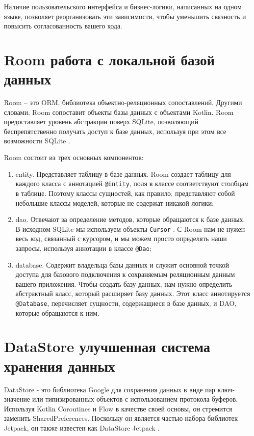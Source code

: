 Наличие пользовательского интерфейса и бизнес-логики, написанных на одном языке, позволяет реорганизовать эти зависимости, чтобы уменьшить связность и повысить согласованность вашего кода.

\section{Room работа с локальной базой данных}

Room -- это ORM, библиотека объектно-реляционных сопоставлений.  Другими словами, Room сопоставит объекты базы данных с объектами Kotlin. Room предоставляет уровень абстракции поверх SQLite, позволяющий беспрепятственно получать доступ к базе данных, используя при этом все возможности SQLite \cite{book:ROOM}.

Room состоит из трех основных компонентов:
\begin{enumerate}
    \item entity. Представляет таблицу в базе данных. Room создает таблицу для каждого класса с аннотацией \verb|@Entity|, поля в классе соответствуют столбцам в таблице. Поэтому классы сущностей, как правило, представляют собой небольшие классы моделей, которые не содержат никакой логики;
    \item dao. Отвечают за определение методов, которые обращаются к базе данных. В исходном SQLite мы используем объекты \verb|Cursor| \cite{book:sqlite2}. С Room нам не нужен весь код, связанный с курсором, и мы можем просто определять наши запросы, используя аннотации в классе \verb|@Dao|;
    \item database. Содержит владельца базы данных и служит основной точкой доступа для базового подключения к сохраняемым реляционным данным вашего приложения. Чтобы создать базу данных, нам нужно определить абстрактный класс, который расширяет базу данных. Этот класс аннотируется \verb|@Database|, перечисляет сущности, содержащиеся в базе данных, и DAO, которые обращаются к ним.
\end{enumerate}


\section{DataStore улучшенная система хранения данных}

DataStore - это библиотека Google для сохранения данных в виде пар ключ-значение или типизированных объектов с использованием протокола буферов. Используя Kotlin Coroutines и Flow в качестве своей основы, он стремится заменить SharedPreferences. Поскольку он является частью набора библиотек Jetpack, он также известен как DataStore Jetpack \cite{book:dataStore}.


